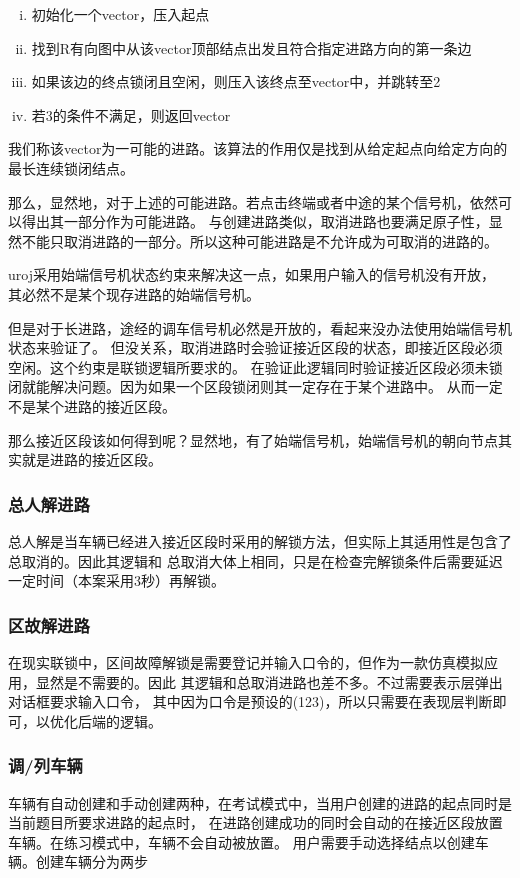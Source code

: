 \begin{enumerate}[i.]
    \item 初始化一个vector，压入起点
    \item 找到R有向图中从该vector顶部结点出发且符合指定进路方向的第一条边
    \item 如果该边的终点锁闭且空闲，则压入该终点至vector中，并跳转至2
    \item 若3的条件不满足，则返回vector
\end{enumerate}

我们称该vector为一可能的进路。该算法的作用仅是找到从给定起点向给定方向的最长连续锁闭结点。

那么，显然地，对于上述的可能进路。若点击终端或者中途的某个信号机，依然可以得出其一部分作为可能进路。
与创建进路类似，取消进路也要满足原子性，显然不能只取消进路的一部分。所以这种可能进路是不允许成为可取消的进路的。

uroj采用始端信号机状态约束来解决这一点，如果用户输入的信号机没有开放，
其必然不是某个现存进路的始端信号机。

但是对于长进路，途经的调车信号机必然是开放的，看起来没办法使用始端信号机状态来验证了。
但没关系，取消进路时会验证接近区段的状态，即接近区段必须空闲。这个约束是联锁逻辑所要求的。
在验证此逻辑同时验证接近区段必须未锁闭就能解决问题。因为如果一个区段锁闭则其一定存在于某个进路中。
从而一定不是某个进路的接近区段。

那么接近区段该如何得到呢？显然地，有了始端信号机，始端信号机的朝向节点其实就是进路的接近区段。

\subsubsection{总人解进路}
总人解是当车辆已经进入接近区段时采用的解锁方法，但实际上其适用性是包含了总取消的。因此其逻辑和
总取消大体上相同，只是在检查完解锁条件后需要延迟一定时间（本案采用3秒）再解锁。

\subsubsection{区故解进路}
在现实联锁中，区间故障解锁是需要登记并输入口令的，但作为一款仿真模拟应用，显然是不需要的。因此
其逻辑和总取消进路也差不多。不过需要表示层弹出对话框要求输入口令，
其中因为口令是预设的(123)，所以只需要在表现层判断即可，以优化后端的逻辑。

\subsubsection{调/列车辆}
车辆有自动创建和手动创建两种，在考试模式中，当用户创建的进路的起点同时是当前题目所要求进路的起点时，
在进路创建成功的同时会自动的在接近区段放置车辆。在练习模式中，车辆不会自动被放置。
用户需要手动选择结点以创建车辆。创建车辆分为两步

